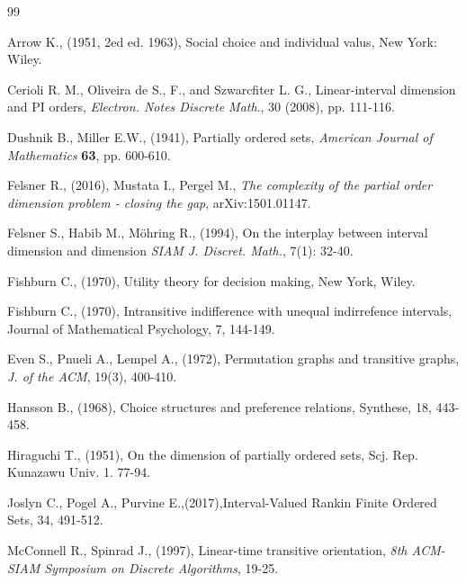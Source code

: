 \documentclass{article}
\theoremstyle{definition}
\begin{document}
\begin{thebibliography}{99}


 Arrow K., (1951, 2ed ed. 1963), Social choice and individual valus, New York: Wiley.

Cerioli R. M., Oliveira de S., F., and Szwarcfiter L. G., Linear-interval dimension and PI orders, {\it Electron. Notes Discrete Math}., 30 (2008), pp. 111-116.



Dushnik B., Miller E.W., (1941), Partially ordered sets, {\it American Journal of Mathematics} {\bf 63},
pp. 600-610.





Felsner R., (2016), Mustata I., Pergel M., {\it The complexity of the partial order dimension problem - closing the gap}, arXiv:1501.01147.





Felsner S., Habib M., M\"{o}hring R., (1994), On the interplay between interval dimension and dimension {\it SIAM J. Discret. Math.}, 7(1): 32-40.









 Fishburn C., (1970),
Utility theory for decision making, New York, Wiley.

 Fishburn C., (1970), Intransitive indifference with unequal indirrefence intervals,
Journal of Mathematical Psychology, 7, 144-149.



Even S., Pnueli A., Lempel A., (1972), Permutation graphs and transitive graphs, {\it J. of the ACM}, 19(3), 
400-410.





Hansson B., (1968), Choice structures and preference relations, Synthese, 18, 443-458.

Hiraguchi T., (1951), On the dimension of partially ordered sets, Scj. Rep. Kunazawu Univ. 1. 77-94. 

Joslyn C., Pogel A., Purvine   E.,(2017),Interval-Valued Rankin Finite Ordered Sets, 34, 491-512.


McConnell R., Spinrad J., (1997), Linear-time transitive orientation, {\it 8th ACM-SIAM Symposium on Discrete Algorithms}, 19-25.


\end{thebibliography}
\end{document}
